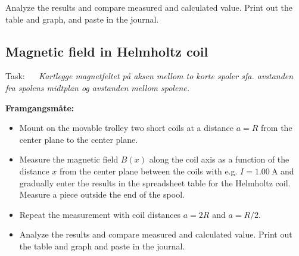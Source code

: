 \documentclass[../Elmag-labhefte-2020.tex]{subfiles}
\begin{document}
Analyze the results and compare measured and calculated value. Print out the table and graph, and paste in the journal.

\subsection{Magnetic field in Helmholtz coil}

Task: \ \
\emph{ Kartlegge magnetfeltet på aksen mellom to korte spoler sfa. avstanden fra spolens midtplan og avstanden mellom spolene.}
 
\textbf{Framgangsmåte:}
\vspace{-5mm}
\begin{itemize}
    \item Mount on the movable trolley two short coils at a distance $a = R$ from the center plane to the center plane.
    \item Measure the magnetic field $B(x)$ along the coil axis as a function of the distance $x$ from the center plane between the coils with e.g. $I = \SI{1,00}{\ampere}$ and gradually enter the results in the spreadsheet table for the Helmholtz coil. Measure a piece outside the end of the spool.
    \item Repeat the measurement with coil distances $a = 2R$ and $a = R/2$.
    \item Analyze the results and compare measured and calculated value. Print out the table and graph and paste in the journal.
\end{itemize}
\end{document}

